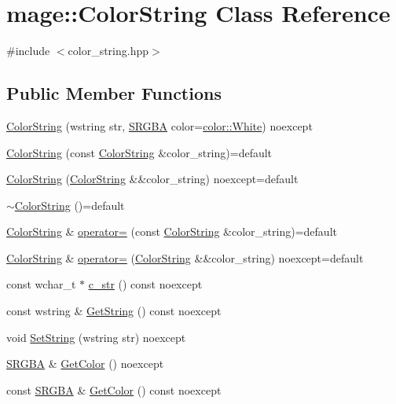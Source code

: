 \hypertarget{classmage_1_1_color_string}{}\section{mage\+:\+:Color\+String Class Reference}
\label{classmage_1_1_color_string}


{\ttfamily \#include $<$color\+\_\+string.\+hpp$>$}

\subsection*{Public Member Functions}
\begin{DoxyCompactItemize}
\item 
\hyperlink{classmage_1_1_color_string_a7bdfb4d0472d3a66edefab805b0b3dbf}{Color\+String} (wstring str, \hyperlink{structmage_1_1_s_r_g_b_a}{S\+R\+G\+BA} color=\hyperlink{namespacemage_1_1color_a727b7cc976b22af2949cec8bebdb3e74}{color\+::\+White}) noexcept
\item 
\hyperlink{classmage_1_1_color_string_aa878fda012b4149f673e905f6a8ea8b0}{Color\+String} (const \hyperlink{classmage_1_1_color_string}{Color\+String} \&color\+\_\+string)=default
\item 
\hyperlink{classmage_1_1_color_string_a47afe208490b4c93daaa755f468d860a}{Color\+String} (\hyperlink{classmage_1_1_color_string}{Color\+String} \&\&color\+\_\+string) noexcept=default
\item 
\hyperlink{classmage_1_1_color_string_a95886010269c8c4bc3a27fbfe829f4c2}{$\sim$\+Color\+String} ()=default
\item 
\hyperlink{classmage_1_1_color_string}{Color\+String} \& \hyperlink{classmage_1_1_color_string_a568fed43403422ecafdf92d04e11c4e5}{operator=} (const \hyperlink{classmage_1_1_color_string}{Color\+String} \&color\+\_\+string)=default
\item 
\hyperlink{classmage_1_1_color_string}{Color\+String} \& \hyperlink{classmage_1_1_color_string_aa909f18891bd31a23f2b7c877806bef1}{operator=} (\hyperlink{classmage_1_1_color_string}{Color\+String} \&\&color\+\_\+string) noexcept=default
\item 
const wchar\+\_\+t $\ast$ \hyperlink{classmage_1_1_color_string_af2241b81cac59051e9ebf0ddefe719ed}{c\+\_\+str} () const noexcept
\item 
const wstring \& \hyperlink{classmage_1_1_color_string_aee22268a2fe552320299dfa5ac5a93e1}{Get\+String} () const noexcept
\item 
void \hyperlink{classmage_1_1_color_string_ae735ab55789bb21741c6ad3c8115a146}{Set\+String} (wstring str) noexcept
\item 
\hyperlink{structmage_1_1_s_r_g_b_a}{S\+R\+G\+BA} \& \hyperlink{classmage_1_1_color_string_a524e8a66e94a353724c45728e3b73dc1}{Get\+Color} () noexcept
\item 
const \hyperlink{structmage_1_1_s_r_g_b_a}{S\+R\+G\+BA} \& \hyperlink{classmage_1_1_color_string_a51e959bf9ba68b767fe2b61655a9c7a9}{Get\+Color} () const noexcept
\end{DoxyCompactItemize}
